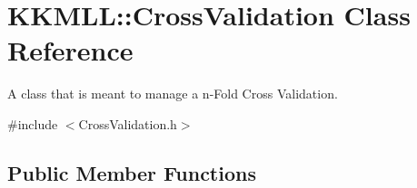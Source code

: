 \hypertarget{class_k_k_m_l_l_1_1_cross_validation}{}\section{K\+K\+M\+LL\+:\+:Cross\+Validation Class Reference}
\label{class_k_k_m_l_l_1_1_cross_validation}


A class that is meant to manage a n-\/\+Fold Cross Validation.  




{\ttfamily \#include $<$Cross\+Validation.\+h$>$}

\subsection*{Public Member Functions}
